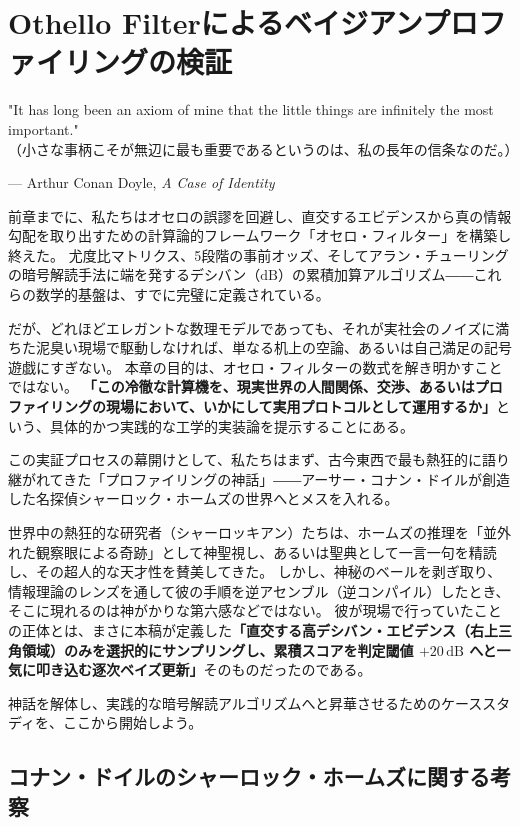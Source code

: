 \chapter{Othello Filterによるベイジアンプロファイリングの検証}
\epigraph{"It has long been an axiom of mine that the little things are infinitely the most important."\\
\small（小さな事柄こそが無辺に最も重要であるというのは、私の長年の信条なのだ。）}{--- Arthur Conan Doyle, \textit{A Case of Identity}}
前章までに、私たちはオセロの誤謬を回避し、直交するエビデンスから真の情報勾配を取り出すための計算論的フレームワーク「オセロ・フィルター」を構築し終えた。
尤度比マトリクス、5段階の事前オッズ、そしてアラン・チューリングの暗号解読手法に端を発するデシバン（$\mathrm{dB}$）の累積加算アルゴリズム――これらの数学的基盤は、すでに完璧に定義されている。

だが、どれほどエレガントな数理モデルであっても、それが実社会のノイズに満ちた泥臭い現場で駆動しなければ、単なる机上の空論、あるいは自己満足の記号遊戯にすぎない。
本章の目的は、オセロ・フィルターの数式を解き明かすことではない。
\textbf{「この冷徹な計算機を、現実世界の人間関係、交渉、あるいはプロファイリングの現場において、いかにして実用プロトコルとして運用するか」}という、具体的かつ実践的な工学的実装論を提示することにある。

この実証プロセスの幕開けとして、私たちはまず、古今東西で最も熱狂的に語り継がれてきた「プロファイリングの神話」――アーサー・コナン・ドイルが創造した名探偵シャーロック・ホームズの世界へとメスを入れる。

世界中の熱狂的な研究者（シャーロッキアン）たちは、ホームズの推理を「並外れた観察眼による奇跡」として神聖視し、あるいは聖典として一言一句を精読し、その超人的な天才性を賛美してきた。
しかし、神秘のベールを剥ぎ取り、情報理論のレンズを通して彼の手順を逆アセンブル（逆コンパイル）したとき、そこに現れるのは神がかりな第六感などではない。
彼が現場で行っていたことの正体とは、まさに本稿が定義した\textbf{「直交する高デシバン・エビデンス（右上三角領域）のみを選択的にサンプリングし、累積スコアを判定閾値 $+20\,\mathrm{dB}$ へと一気に叩き込む逐次ベイズ更新」}そのものだったのである。

神話を解体し、実践的な暗号解読アルゴリズムへと昇華させるためのケーススタディを、ここから開始しよう。


\section{コナン・ドイルのシャーロック・ホームズに関する考察}

